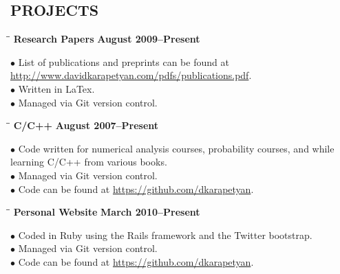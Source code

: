 \documentclass{resume}
\begin{document}
\begin{resume}
\section{PROJECTS}
   \begin{tabbing}
		\hspace{2.3in}\= \hspace{2.6in}\= \kill
        {\bf Research Papers} \>    
	\>\textbf{August 2009--Present} \\
		\> 
	\end{tabbing}\vspace{-15pt}    
$\bullet$ List of publications and preprints can be found at 
\href{http://www.davidkarapetyan.com/pdfs/publications.pdf}{http://www.davidkarapetyan.com/pdfs/publications.pdf}.
\\
$\bullet$ Written in LaTex. 
\\
$\bullet$ Managed via Git version control.

   \begin{tabbing}
		\hspace{2.3in}\= \hspace{2.6in}\= \kill
        {\bf C/C++} \>    
	\>\textbf{August 2007--Present} \\
		\> 
	\end{tabbing}\vspace{-15pt}    
$\bullet$ Code written for numerical analysis courses, probability courses, and while learning C/C++ from various books. 
\\
$\bullet$ Managed via Git version control.
\\
$\bullet$ Code can be found at \href{https://github.com/dkarapetyan}{https://github.com/dkarapetyan}. 

	\vspace{0.05in}	


	\newpage

    \begin{tabbing}
		\hspace{2.3in}\= \hspace{2.6in}\= \kill
        {\bf Personal Website } \>    
	\>\textbf{March 2010--Present} \\
		\> 
	\end{tabbing}\vspace{-15pt}    
$\bullet$ Coded in Ruby using the Rails framework and the Twitter bootstrap.\\
$\bullet$ Managed via Git version control.
\\
$\bullet$ Code can be found at \href{https://github.com/dkarapetyan}{https://github.com/dkarapetyan}.


\end{resume}
\end{document}
